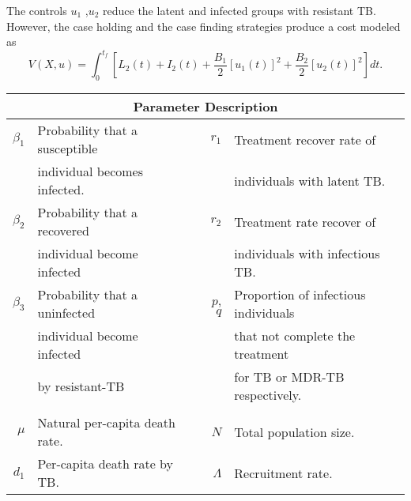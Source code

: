 	The controls $u_1$ ,$u_2$ reduce the latent and infected 
groups with resistant TB. However, the case holding and the case finding 
strategies produce a cost modeled as
\begin{equation}\label{eqn:MDR-TB_action}
   V(X, u) = 
		 \int_0 ^ {t_f}
			 \left[
				 L_2(t) + I_2(t) 
				 + \frac{B_1}{2} [u_1(t)] ^ 2
				 + \frac{B_2}{2} [u_2(t)] ^ 2
			 \right]dt.
\end{equation}
%
%
\begin{table}[htb]
  \centering
  \begin{tabular}{rllrl}
    \toprule
       \multicolumn{5}{c}{\textbf{Parameter Description}}\\
        \midrule
        $\beta_1$ 
            & Probability that a susceptible 
        &&
          $r_1$ 
            & 
            Treatment recover rate of 
        \\
         & individual becomes infected.
           &&&
            individuals with latent TB.
        \\
        $\beta_2$ 
          & Probability that a recovered 
        && 
          $r_2$ 
            &
            Treatment rate recover of 
          \\
          & individual  become infected
            &&&
              individuals with infectious TB.
          \\
        $\beta_3$ 
          & Probability that a uninfected 
          &&
          $p$, $q$
          & 
            Proportion of infectious individuals 
          \\
          & individual become infected 
            &&&
              that not complete the treatment
            \\
          & by resistant-TB 
            &&&
              for TB or MDR-TB respectively.
      \\
      \\
        $\mu$ 
          & Natural per-capita death rate.
          &&
            $N$ 
            &
              Total population size.
      \\
        $d_1$ 
          & Per-capita death rate by TB.
          &&
            $\Lambda$
            & Recruitment rate.
              

\end{tabular}
\end{table}
